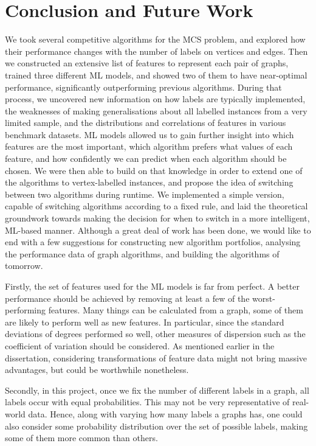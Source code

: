 \documentclass{l4proj}
\theoremstyle{definition}
\theoremstyle{remark}
\begin{document}
\chapter{Conclusion and Future Work}

We took several competitive algorithms for the MCS problem, and explored how their
performance changes with the number of labels on vertices and edges. Then we
constructed an extensive list of features to represent each pair of graphs,
trained three different ML models, and showed two of them to have near-optimal
performance, significantly outperforming previous algorithms. During that
process, we uncovered new information on how labels are typically implemented,
the weaknesses of making generalisations about all labelled instances from a
very limited sample, and the distributions and correlations of features in
various benchmark datasets. ML models allowed us to gain further insight into
which features are the most important, which algorithm prefers what values of
each feature, and how confidently we can predict when each algorithm should be
chosen. We were then able to build on that knowledge in order to extend one of
the algorithms to vertex-labelled instances, and propose the idea of switching
between two algorithms during runtime. We implemented a simple version, capable
of switching algorithms according to a fixed rule, and laid the theoretical
groundwork towards making the decision for when to switch in a more intelligent,
ML-based manner. Although a great deal of work has been done, we would like to
end with a few suggestions for constructing new algorithm portfolios, analysing
the performance data of graph algorithms, and building the algorithms of
tomorrow.

Firstly, the set of features used for the ML models is far from perfect. A
better performance should be achieved by removing at least a few of the
worst-performing features. Many things can be calculated from a graph, some of
them are likely to perform well as new features. In particular, since the
standard deviations of degrees performed so well, other measures of dispersion
such as the coefficient of variation should be considered. As mentioned earlier
in the dissertation, considering transformations of feature data might not bring
massive advantages, but could be worthwhile nonetheless.

Secondly, in this project, once we fix the number of different labels in a
graph, all labels occur with equal probabilities. This may not be very
representative of real-world data. Hence, along with varying how many labels a
graphs has, one could also consider some probability distribution over the set
of possible labels, making some of them more common than others.
\end{document}
